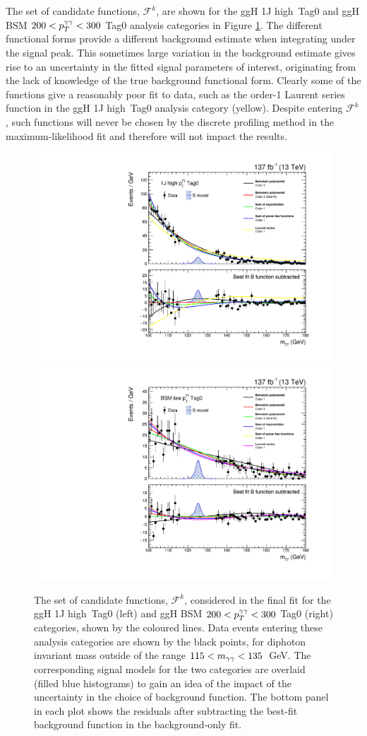 The set of candidate functions, $\mathcal{F}^k$, are shown for the ggH 1J high~\ptgg Tag0 and ggH BSM $200<\ptgg<300$ Tag0 analysis categories in Figure \ref{fig:bkgmodels_category}. The different functional forms provide a different background estimate when integrating under the signal peak. This sometimes large variation in the background estimate gives rise to an uncertainty in the fitted signal parameters of interest, originating from the lack of knowledge of the true background functional form. Clearly some of the functions give a reasonably poor fit to data, such as the order-1 Laurent series function in the ggH 1J high~\ptgg Tag0 analysis category (yellow). Despite entering $\mathcal{F}^k$, such functions will never be chosen by the discrete profiling method in the maximum-likelihood fit and therefore will not impact the results.

\begin{figure}
  \centering
  \includegraphics[width=.49\textwidth]{Figures/hgg_stats/bmodel_RECO_1J_PTH_120_200_Tag0.pdf}
  \hfill
  \includegraphics[width=.49\textwidth]{Figures/hgg_stats/bmodel_RECO_PTH_200_300_Tag0.pdf}
  \caption[Background models for the 1J high \ptgg Tag0 and BSM $200<\ptgg<300$ Tag0 categories]
  {
    The set of candidate functions, $\mathcal{F}^k$, considered in the final fit for the ggH 1J high~\ptgg Tag0 (left) and ggH BSM $200<\ptgg<300$ Tag0 (right) categories, shown by the coloured lines. Data events entering these analysis categories are shown by the black points, for diphoton invariant mass outside of the range $115<m_{\gamma\gamma}<135$~GeV. The corresponding signal models for the two categories are overlaid (filled blue histograms) to gain an idea of the impact of the uncertainty in the choice of background function. The bottom panel in each plot shows the residuals after subtracting the best-fit background function in the background-only fit.
  }
  \label{fig:bkgmodels_category}
\end{figure}

